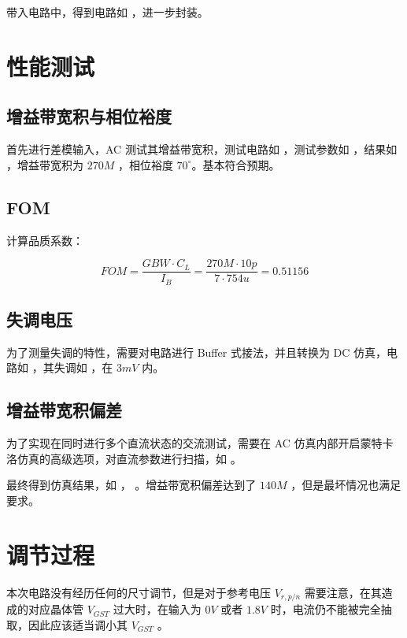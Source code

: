 \documentclass[lang=cn,11pt,a4paper,cite=authoryear]{elegantpaper}
\begin{document}
带入电路中，得到电路如  ，进一步封装。




\section{性能测试} 

\subsection{增益带宽积与相位裕度}

首先进行差模输入，AC 测试其增益带宽积，测试电路如  ，测试参数如  ，结果如  ，增益带宽积为 \(270 M\) ，相位裕度 \(70^\circ\)。基本符合预期。






\subsection{FOM} 

计算品质系数：

\[FOM = \frac{GBW \cdot C_L}{I_B} = \frac{270 M \cdot 10 p}{7 \cdot 754 u} = 0.51156\] 

\subsection{失调电压} 

为了测量失调的特性，需要对电路进行 Buffer 式接法，并且转换为 DC 仿真，电路如  ，其失调如  ，在 \(3 mV\) 内。



\subsection{增益带宽积偏差}

为了实现在同时进行多个直流状态的交流测试，需要在 AC 仿真内部开启蒙特卡洛仿真的高级选项，对直流参数进行扫描，如  。



最终得到仿真结果，如  ， 。增益带宽积偏差达到了 \(140 M\) ，但是最坏情况也满足要求。


\section{调节过程}

本次电路没有经历任何的尺寸调节，但是对于参考电压 \(V_{r,p/n} \) 需要注意，在其造成的对应晶体管 \(V_{GST}\) 过大时，在输入为 \(0 V\) 或者 \(1.8 V\) 时，电流仍不能被完全抽取，因此应该适当调小其 \(V_{GST}\) 。

\end{document}
